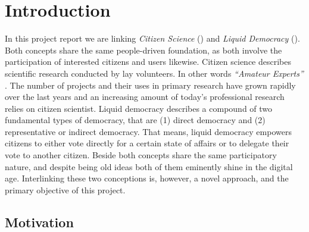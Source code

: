 \chapter{Introduction}
\label{ch:Introduction}


In this project report we are linking \textit{Citizen Science} () and \textit{Liquid Democracy} (). Both concepts share the same people-driven foundation, as both involve the participation of interested citizens and users likewise. Citizen science describes scientific research conducted by lay volunteers. In other words \textit{“Amateur Experts”}  \parencite{Gura2013}. The number of  projects and their uses in primary research have grown rapidly over the last years \parencite{Kosmala2016} and an increasing amount of today’s professional research relies on citizen scientist. Liquid democracy describes a compound of two fundamental types of democracy, that are (1) direct democracy and (2) representative or indirect democracy. That means, liquid democracy empowers citizens to either vote directly for a certain state of affairs or to  delegate their vote to another citizen. Beside both concepts share the same participatory nature, and despite being old ideas both of them eminently shine in the digital age. Interlinking these two conceptions is, however, a novel approach, and the primary objective of this project.


\section{Motivation}
\label{sec:Motivation}

